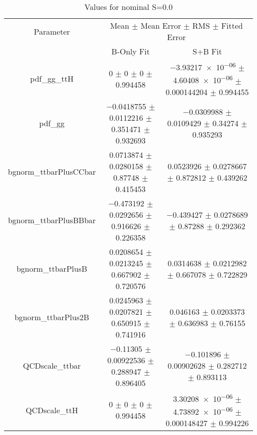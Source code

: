 \begin{table}
\centering
\caption{Values for nominal S=0.0}
\begin{tabular}{ccc}
\toprule
Parameter & \multicolumn{2}{c}{Mean $\pm$ Mean Error $\pm$ RMS $\pm$ Fitted Error}\\
 & B-Only Fit & S+B Fit\\
\midrule
pdf\_gg\_ttH & \num{0} $\pm$ \num{0} $\pm$ \num{0} $\pm$ \num{0.994458} & \num{-3.93217e-06} $\pm$ \num{4.60408e-06} $\pm$ \num{0.000144204} $\pm$ \num{0.994455}\\
pdf\_gg & \num{-0.0418755} $\pm$ \num{0.0112216} $\pm$ \num{0.351471} $\pm$ \num{0.932693} & \num{-0.0309988} $\pm$ \num{0.0109429} $\pm$ \num{0.34274} $\pm$ \num{0.935293}\\
bgnorm\_ttbarPlusCCbar & \num{0.0713874} $\pm$ \num{0.0280158} $\pm$ \num{0.87748} $\pm$ \num{0.415453} & \num{0.0523926} $\pm$ \num{0.0278667} $\pm$ \num{0.872812} $\pm$ \num{0.439262}\\
bgnorm\_ttbarPlusBBbar & \num{-0.473192} $\pm$ \num{0.0292656} $\pm$ \num{0.916626} $\pm$ \num{0.226358} & \num{-0.439427} $\pm$ \num{0.0278689} $\pm$ \num{0.87288} $\pm$ \num{0.292362}\\
bgnorm\_ttbarPlusB & \num{0.0208654} $\pm$ \num{0.0213245} $\pm$ \num{0.667902} $\pm$ \num{0.720576} & \num{0.0314638} $\pm$ \num{0.0212982} $\pm$ \num{0.667078} $\pm$ \num{0.722829}\\
bgnorm\_ttbarPlus2B & \num{0.0245963} $\pm$ \num{0.0207821} $\pm$ \num{0.650915} $\pm$ \num{0.741916} & \num{0.046163} $\pm$ \num{0.0203373} $\pm$ \num{0.636983} $\pm$ \num{0.76155}\\
QCDscale\_ttbar & \num{-0.11305} $\pm$ \num{0.00922536} $\pm$ \num{0.288947} $\pm$ \num{0.896405} & \num{-0.101896} $\pm$ \num{0.00902628} $\pm$ \num{0.282712} $\pm$ \num{0.893113}\\
QCDscale\_ttH & \num{0} $\pm$ \num{0} $\pm$ \num{0} $\pm$ \num{0.994458} & \num{3.30208e-06} $\pm$ \num{4.73892e-06} $\pm$ \num{0.000148427} $\pm$ \num{0.994226}\\
\bottomrule
\end{tabular}
\end{table}